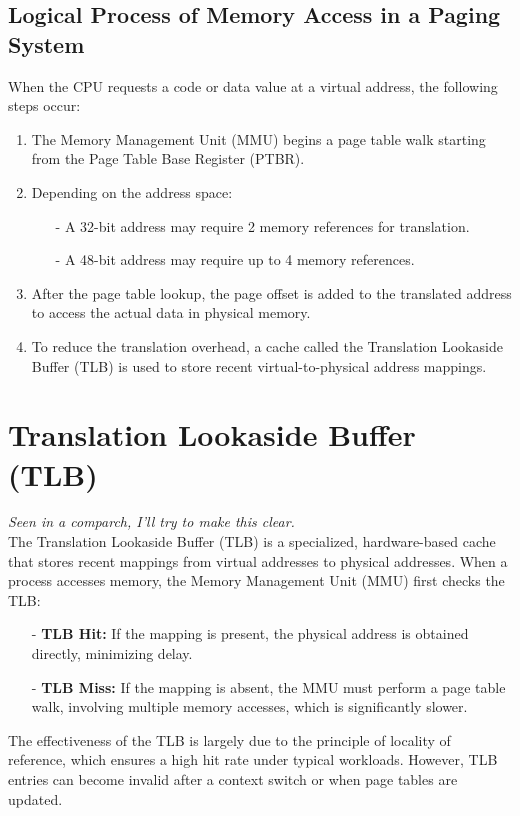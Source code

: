 \documentclass[../../compsys.tex]{subfiles}
\begin{document}
\subsection{Logical Process of Memory Access in a Paging System}
When the CPU requests a code or data value at a virtual address, the following steps occur:
\begin{enumerate}
    \item The Memory Management Unit (MMU) begins a page table walk starting from the Page Table Base Register (PTBR).
    \item Depending on the address space:
    \begin{itemize}
      \item[-] A 32-bit address may require 2 memory references for translation.
      \item[-] A 48-bit address may require up to 4 memory references.
    \end{itemize}
    \item After the page table lookup, the page offset is added to the translated address to access the actual data in physical memory.
    \item To reduce the translation overhead, a cache called the Translation Lookaside Buffer (TLB) is used to store recent virtual-to-physical address mappings.
\end{enumerate}


\section{Translation Lookaside Buffer (TLB)}
\textit{Seen in a comparch, I'll try to make this clear.}\\

The Translation Lookaside Buffer (TLB) is a specialized, hardware-based cache that stores recent mappings from virtual addresses to physical addresses. When a process accesses memory, the Memory Management Unit (MMU) first checks the TLB:
\begin{itemize}
  \item[-] \textbf{TLB Hit:} If the mapping is present, the physical address is obtained directly, minimizing delay.
  \item[-] \textbf{TLB Miss:} If the mapping is absent, the MMU must perform a page table walk, involving multiple memory accesses, which is significantly slower.
\end{itemize}

The effectiveness of the TLB is largely due to the principle of locality of reference, which ensures a high hit rate under typical workloads. However, TLB entries can become invalid after a context switch or when page tables are updated.
\end{document}
